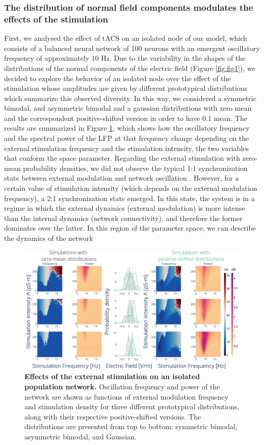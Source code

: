 \documentclass[../main.tex]{subfiles}
\begin{document}
\subsubsection{The distribution of normal field components modulates the effects of the stimulation}
First, we analysed the effect of tACS on an isolated node of our model, which consists of a balanced neural network of 100 neurons with an emergent oscillatory frequency of approximately 10 Hz.
Due to the variability in the shapes of the distributions of the normal components of the electric field (Figure \ref{fig:fig1}), we decided to explore the behavior of an isolated node over the effect of the stimulation whose amplitudes are given by different prototypical distributions which summarize this observed diversity.
In this way, we considered a symmetric bimodal, and asymmetric bimodal and a gaussian distributions with zero mean and the correspondent positive-shifted version in order to have $0.1$ mean. 
The results are summarized in Figure \ref{fig:fig6}, which shows how the oscillatory frequency and the spectral power of the LFP at that frequency change depending on the external stimulation frequency and the stimulation intensity, the two variables that conform the space parameter.
Regarding the external stimulation with zero-mean probability densities, we did not observe the typical 1:1 synchronization state between external modulation and network oscillation \citep{MONTOYA20133124,PhysRevE.60.2086,PhysRevE.77.056203}.
However, for a certain value of stimulation intensity (which depends on the external modulation frequency), a 2:1 synchronization state emerged.
In this state, the system is in a regime in which the external dynamics (external modulation) is more intense than the internal dynamics (network connectivity), and therefore the former dominates over the latter.
In this region of the parameter space, we can describe the dynamics of the network
\begin{figure}[!htb]
    \centering
    \includegraphics[width=\textwidth]{chapter3/figures/theoretical_distributions_effect.png}
    \caption{\textbf{Effects of the external stimulation on an isolated population network.}
    Oscillation frequency and power of the network are shown as functions of external modulation frequency and stimulation density for three different prototypical distributions, along with their respective positive-shifted versions.
    The distributions are presented from top to bottom: symmetric bimodal, asymmetric bimodal, and Gaussian.}
    \label{fig:fig6}
\end{figure}
\end{document}
